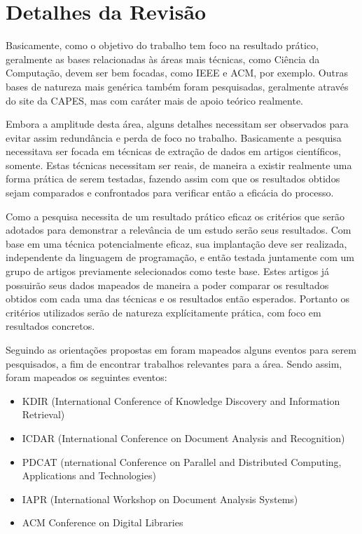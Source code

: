 \documentclass[
	12pt,               %
	openright,          %
	twoside,            %
	a4paper,            %
	english,            %
	brazil              %
	]{abntex2}
\begin{document}
\section{Detalhes da Revisão}


Basicamente, como o objetivo do trabalho tem foco na resultado prático, geralmente as bases relacionadas às áreas mais técnicas, como Ciência da Computação, devem ser bem focadas, como IEEE e ACM, por exemplo. Outras bases de natureza mais genérica também foram pesquisadas, geralmente através do site da CAPES, mas com caráter mais de apoio teórico realmente.

Embora a amplitude desta área, alguns detalhes necessitam ser observados para evitar assim redundância e perda de foco no trabalho. Basicamente a pesquisa necessitava ser focada em técnicas de extração de dados em artigos científicos, somente. Estas técnicas necessitam ser reais, de maneira a existir realmente uma forma prática de serem testadas, fazendo assim com que os resultados obtidos sejam comparados e confrontados para verificar então a eficácia do processo.

Como a pesquisa necessita de um resultado prático eficaz os critérios que serão adotados para demonstrar a relevância de um estudo serão seus resultados. Com base em uma técnica potencialmente eficaz, sua implantação deve ser realizada, independente da linguagem de programação, e então testada juntamente com um grupo de artigos previamente selecionados como teste base. Estes artigos já possuirão seus dados mapeados de maneira a poder comparar os resultados obtidos com cada uma das técnicas e os resultados então esperados. Portanto os critérios utilizados serão de natureza explícitamente prática, com foco em resultados concretos.


Seguindo as orientações propostas em \cite{rsl-manual} foram mapeados alguns eventos para serem pesquisados, a fim de encontrar trabalhos relevantes para a área. Sendo assim, foram mapeados os seguintes eventos:

\begin{itemize}
\item KDIR (International Conference of Knowledge Discovery and Information Retrieval)
\item ICDAR (International Conference on Document Analysis and Recognition)
\item PDCAT (nternational Conference on Parallel and Distributed Computing, Applications and Technologies)
\item IAPR (International Workshop on Document Analysis Systems)
\item ACM Conference on Digital Libraries
\end{itemize}
\end{document}
